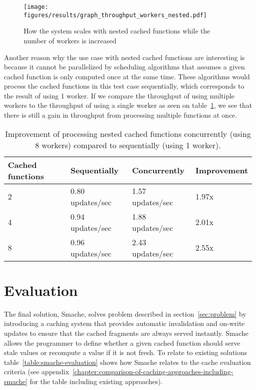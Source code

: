 \begin{figure*}[ht!]
  \centering
  \texttt{[image: figures/results/graph\_throughput\_workers\_nested.pdf]}
  \caption{How the system scales with nested cached functions while the number of workers is increased}
  \label{fig:graph_throughput_workers_nested}
\end{figure*}

Another reason why the use case with nested cached functions are interesting is because it cannot be parallelized by scheduling algorithms that assumes a given cached function is only computed once at the same time. These algorithms would process the cached functions in this test case sequentially, which corresponds to the result of using 1 worker. If we compare the throughput of using multiple workers to the throughput of using a single worker as seen on table~\ref{tab:nested-relative-results}, we see that there is still a gain in throughput from processing multiple functions at once.

\begin{table}[ht!]
  \centering
  \begin{tabular}{llll}
    \hline
    Cached functions & Sequentially & Concurrently & Improvement \\
    \hline
    2 & 0.80 updates/sec & 1.57 updates/sec & 1.97x \\
    4 & 0.94 updates/sec & 1.88 updates/sec & 2.01x \\
    8 & 0.96 updates/sec & 2.43 updates/sec & 2.55x \\
    \hline
  \end{tabular}
  \caption{Improvement of processing nested cached functions concurrently (using 8 workers) compared to sequentially (using 1 worker).}
  \label{tab:nested-relative-results}
\end{table}

\section{Evaluation}
\label{sec:evaluation}

The final solution, Smache, solves problem described in section~\ref{sec:problem} by introducing a caching system that provides automatic invalidation and on-write updates to ensure that the cached fragments are always served instantly. Smache allows the programmer to define whether a given cached function should serve stale values or recompute a value if it is not fresh. To relate to existing solutions table~\ref{table:smache-evaluation} shows how Smache relates to the cache evaluation criteria (see appendix~\ref{chapter:comparison-of-caching-approaches-including-smache} for the table including existing approaches).

